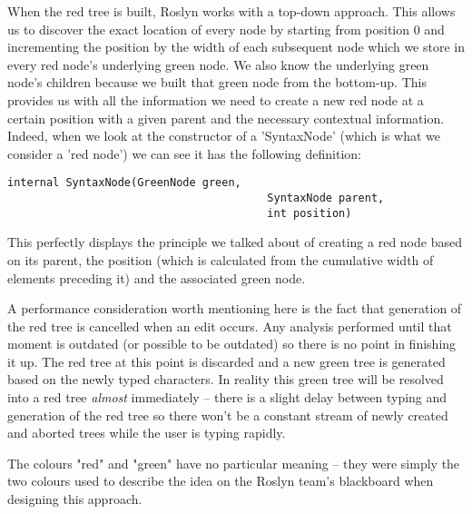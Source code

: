 When the red tree is built, Roslyn works with a top-down approach. This allows us to discover the exact location of every node by starting from position 0 and incrementing the position by the width of each subsequent node which we store in every red node's underlying green node. We also know the underlying green node's children because we built that green node from the bottom-up. This provides us with all the information we need to create a new red node at a certain position with a given parent and the necessary contextual information. Indeed, when we look at the constructor of a 'SyntaxNode' (which is what we consider a 'red node') we can see it has the following definition:

\begin{lstlisting}
internal SyntaxNode(GreenNode green, 
										SyntaxNode parent, 
										int position)
\end{lstlisting}

This perfectly displays the principle we talked about of creating a red node based on its parent, the position (which is calculated from the cumulative width of elements preceding it) and the associated green node.

A performance consideration worth mentioning here is the fact that generation of the red tree is cancelled when an edit occurs. Any analysis performed until that moment is outdated (or possible to be outdated) so there is no point in finishing it up. The red tree at this point is discarded and a new green tree is generated based on the newly typed characters. In reality this green tree will be resolved into a red tree \textit{almost} immediately -- there is a slight delay between typing and generation of the red tree so there won't be a constant stream of newly created and aborted trees while the user is typing rapidly.

The colours "red" and "green" have no particular meaning -- they were simply the two colours used to describe the idea on the Roslyn team's blackboard when designing this approach.

